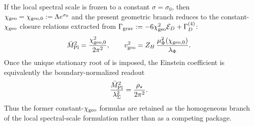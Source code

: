 \begin{corollary}
\label{cor:constant-scale-reduction}
If the local spectral scale is frozen to a constant $\sigma=\sigma_0$, then
$\chi_{\mathrm{geo}}=\chi_{\mathrm{geo},0}:=\Lambda e^{\sigma_0}$ and the present geometric branch reduces to the
constant-$\chi_{\mathrm{geo}}$ closure relations extracted from
$\Gamma_{\mathrm{grav}}:=-6\chi_{\mathrm{geo}}^2\mathcal E_D+\Gamma_D^{(4)}$:
\[
\bar M_{\mathrm{Pl}}^2=\frac{\chi_{\mathrm{geo},0}^2}{2\pi^2},
\qquad
v_{\mathrm{geo}}^2=Z_H\,\frac{\mu_\Phi^2(\chi_{\mathrm{geo},0})}{\lambda_\Phi}.
\]
Once the unique stationary root of  is imposed, the
Einstein coefficient is equivalently the boundary-normalized readout
\[
\frac{\bar M_{\mathrm{Pl}}^2}{\lambda_\Sigma^2}=\frac{\rho_\star}{2\pi^2}.
\]
Thus the former constant-$\chi_{\mathrm{geo}}$ formulas are retained as the homogeneous branch of the local
spectral-scale formulation rather than as a competing package.
\end{corollary}


